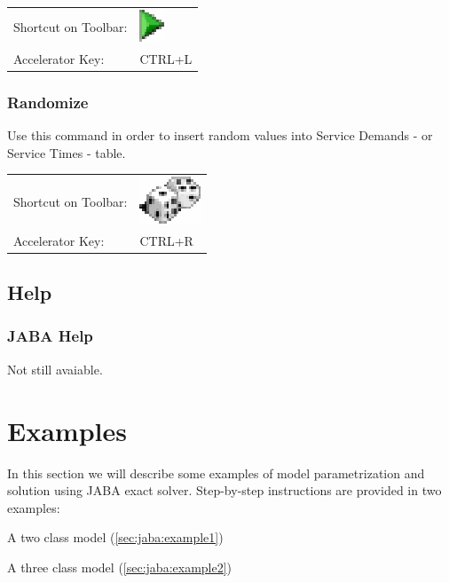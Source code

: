 \noindent
\begin{tabular}{ll}
Shortcut on Toolbar: & \includegraphics[scale=.8]{img/jaba/solve}\\
Accelerator Key: & CTRL+L
\end{tabular}

\subsubsection{Randomize}
Use this command in order to insert random values into Service
Demands - or Service Times - table.

\noindent
\begin{tabular}{ll}
Shortcut on Toolbar: & \includegraphics[scale=.8]{img/jaba/randomize}\\
Accelerator Key: & CTRL+R
\end{tabular}


\subsection{Help}
\subsubsection{JABA Help}
Not still avaiable.

\section{Examples}
In this section we will describe some examples of model
parametrization and solution using JABA exact solver. Step-by-step
instructions are provided in two examples:
\begin{enumerate*}
\item A two class model
(\autoref{sec:jaba:example1})
\item A three class model
(\autoref{sec:jaba:example2})
\end{enumerate*}

